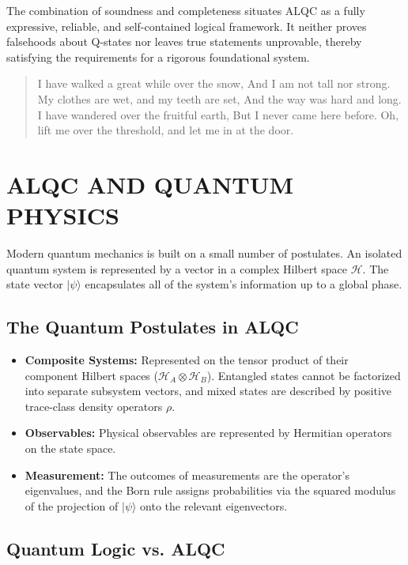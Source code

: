 \documentclass[12pt]{amsart}
\begin{document}
The combination of soundness and completeness situates ALQC as a fully expressive, reliable, and self-contained logical framework. It neither proves falsehoods about Q-states nor leaves true statements unprovable, thereby satisfying the requirements for a rigorous foundational system.

\begin{verse}
    I have walked a great while over the snow,
    And I am not tall nor strong.
    My clothes are wet, and my teeth are set,
    And the way was hard and long.
    I have wandered over the fruitful earth,
    But I never came here before.
    Oh, lift me over the threshold, and let me in at the door.
\end{verse}

\section{ALQC AND QUANTUM PHYSICS}\label{appendixK}

Modern quantum mechanics is built on a small number of postulates. An isolated quantum system is represented by a vector in a complex Hilbert space $\mathcal{H}$. The state vector $|\psi\rangle$ encapsulates all of the system's information up to a global phase.

\subsection{The Quantum Postulates in ALQC}\label{appendixK.1}

\begin{itemize}
    \item \textbf{Composite Systems:} Represented on the tensor product of their component Hilbert spaces ($\mathcal{H}_A \otimes \mathcal{H}_B$). Entangled states cannot be factorized into separate subsystem vectors, and mixed states are described by positive trace-class density operators $\rho$.
    \item \textbf{Observables:} Physical observables are represented by Hermitian operators on the state space.
    \item \textbf{Measurement:} The outcomes of measurements are the operator's eigenvalues, and the Born rule assigns probabilities via the squared modulus of the projection of $|\psi\rangle$ onto the relevant eigenvectors.
\end{itemize}

\subsection{Quantum Logic vs. ALQC}\label{appendixK.2}
\end{document}

